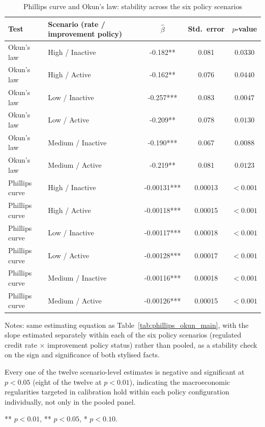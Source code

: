 \begin{table}[htbp]
\centering
\caption{Phillips curve and Okun's law: stability across the six policy scenarios}
\label{tab:phillips_okun_scenarios}
\begin{threeparttable}
\begin{tabular}{llccc}
\toprule
Test & Scenario (rate / improvement policy) & $\hat{\beta}$ & Std.\ error & $p$-value \\
\midrule
Okun's law & High / Inactive & -0.182** & 0.081 & $0.0330$ \\
Okun's law & High / Active & -0.162** & 0.076 & $0.0440$ \\
Okun's law & Low / Inactive & -0.257*** & 0.083 & $0.0047$ \\
Okun's law & Low / Active & -0.209** & 0.078 & $0.0130$ \\
Okun's law & Medium / Inactive & -0.190*** & 0.067 & $0.0088$ \\
Okun's law & Medium / Active & -0.219** & 0.081 & $0.0123$ \\[4pt]
Phillips curve & High / Inactive & -0.00131*** & 0.00013 & $<0.001$ \\
Phillips curve & High / Active & -0.00118*** & 0.00015 & $<0.001$ \\
Phillips curve & Low / Inactive & -0.00117*** & 0.00018 & $<0.001$ \\
Phillips curve & Low / Active & -0.00128*** & 0.00017 & $<0.001$ \\
Phillips curve & Medium / Inactive & -0.00116*** & 0.00018 & $<0.001$ \\
Phillips curve & Medium / Active & -0.00126*** & 0.00015 & $<0.001$ \\
\bottomrule
\end{tabular}
\begin{tablenotes}
\footnotesize
\item Notes: same estimating equation as Table~\ref{tab:phillips_okun_main}, with the slope estimated separately within each of the six policy scenarios (regulated credit rate $\times$ improvement policy status) rather than pooled, as a stability check on the sign and significance of both stylised facts.
\item Every one of the twelve scenario-level estimates is negative and significant at $p<0.05$ (eight of the twelve at $p<0.01$), indicating the macroeconomic regularities targeted in calibration hold within each policy configuration individually, not only in the pooled panel.
\item *** $p<0.01$, ** $p<0.05$, * $p<0.10$.
\end{tablenotes}
\end{threeparttable}
\end{table}